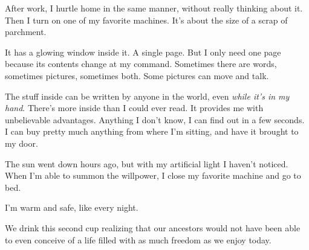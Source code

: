 {  After work, I hurtle home in the same manner, without really thinking about
  it.
  Then I turn on one of my favorite machines. It's about the size of a scrap of
  parchment.

  It has a glowing window inside it. A single page. But I only need one page
  because its contents change at my command. Sometimes there are words,
  sometimes pictures, sometimes both. Some pictures can move and talk.

  \newReading The stuff inside can be written by anyone in the world, even
  \textit{while it's in my hand}. There's more inside than I could ever read. It
  provides me with unbelievable advantages. Anything I don't know, I can find
  out in a few seconds.
  I can buy pretty much anything from where I'm sitting, and have it brought to
  my door.

  The sun went down hours ago, but with my artificial light I haven't noticed.
  When I'm able to summon the willpower, I close my favorite machine and go to
  bed.

  I'm warm and safe, like every night.

  We drink this second cup realizing that our ancestors would not have been able
  to even conceive of a life filled with as much freedom as we enjoy today.
}

